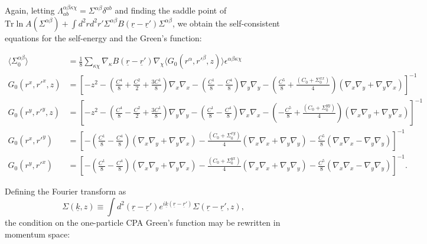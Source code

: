\documentclass[twoside,twocolumn,9pt]{article}
\begin{document}
Again, letting $\Lambda_{ab}^{\alpha\beta\kappa\chi}=\Sigma^{\alpha\beta}\delta^{ab}$ and finding the saddle point of $\text{Tr}\ln A(\Sigma^{\alpha\beta})+\int d^2rd^2r'\Sigma^{\alpha\beta}B(\underline{r}-\underline{r}')\Sigma^{\alpha\beta}$, we obtain the self-consistent equations for the self-energy and the Green's function:
\begin{strip}
\begin{subequations}
\begin{align}
\langle\Sigma_0^{\alpha\beta}\rangle&=\frac{1}{8}\sum_{\kappa\chi}\nabla_\kappa B(\underline{r}-\underline{r}')\nabla_\chi \langle G_0(r^\alpha,r'^\beta,z)\rangle\epsilon^{\alpha\beta\kappa\chi}\\
G_0(r^x,r'^x,z)&=\left[-z^2-\left(\frac{C^4}{8}+\frac{C^2}{2}+\frac{3C^1}{8}\right)\nabla_x\nabla_x-\left(\frac{C^1}{8}-\frac{C^4}{8}\right)\nabla_y\nabla_y
-\left(\frac{C^5}{8}+\frac{(C_0+\Sigma^{xx}_0)}{4}\right)\left(\nabla_x\nabla_y+\nabla_y\nabla_x\right)\right]^{-1}\\
G_0(r^y,r'^y,z)&=\left[-z^2-\left(\frac{C^4}{8}-\frac{C^2}{2}+\frac{3C^1}{8}\right)\nabla_y\nabla_y-\left(\frac{C^1}{8}-\frac{C^4}{8}\right)\nabla_x\nabla_x
-\left(-\frac{C^5}{8}+\frac{(C_0+\Sigma^{yy}_0)}{4}\right)\left(\nabla_x\nabla_y+\nabla_y\nabla_x\right)\right]^{-1}\\
G_0(r^x,r'^y)&=\left[-\left(\frac{C^1}{8}-\frac{C^4}{8}\right)(\nabla_x\nabla_y+\nabla_y\nabla_x)-\frac{(C_0+\Sigma^{xy}_0)}{4}(\nabla_x\nabla_x+\nabla_y\nabla_y)
-\frac{C^5}{8}(\nabla_x\nabla_x-\nabla_y\nabla_y)\right]^{-1}\\
G_0(r^y,r'^x)&=\left[-\left(\frac{C^1}{8}-\frac{C^4}{8}\right)(\nabla_x\nabla_y+\nabla_y\nabla_x)-\frac{(C_0+\Sigma^{yx}_0)}{4}(\nabla_x\nabla_x+\nabla_y\nabla_y)
-\frac{C^5}{8}(\nabla_x\nabla_x-\nabla_y\nabla_y)\right]^{-1}.
\end{align}
\end{subequations}
\end{strip}
Defining the Fourier transform as
\begin{equation}
\Sigma(\underline{k},z)\equiv\int d^2(\underline{r}-\underline{r}')e^{i\underline{k}(\underline{r}-\underline{r}')}\Sigma(\underline{r}-\underline{r}',z),
\end{equation}
the condition on the one-particle CPA Green's function may be rewritten in momentum space:
\end{document}
